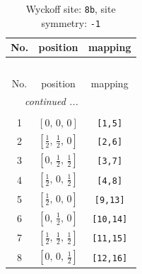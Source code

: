 \documentclass[fleqn,8pt]{jsarticle}
\begin{document}
\begin{longtable}{ccc}
\caption{Wyckoff site: {\tt 8b}, site symmetry: {\tt -1}}
 \\
 \hline \hline
No. & position & mapping \\ \hline \endfirsthead

\multicolumn{2}{l}{\tablename\ \thetable{}} \\
 \hline \hline
No. & position & mapping \\ \hline \endhead

 \hline \hline
\multicolumn{2}{r}{\footnotesize\it continued ...} \\ \endfoot

 \hline \hline
\multicolumn{2}{r}{} \\ \endlastfoot

1 & $\left[ 0,\, 0,\, 0 \right]$ & {\tt [1,5]} \\ \hline
2 & $\left[ \frac{1}{2},\, \frac{1}{2},\, 0 \right]$ & {\tt [2,6]} \\ \hline
3 & $\left[ 0,\, \frac{1}{2},\, \frac{1}{2} \right]$ & {\tt [3,7]} \\ \hline
4 & $\left[ \frac{1}{2},\, 0,\, \frac{1}{2} \right]$ & {\tt [4,8]} \\ \hline
5 & $\left[ \frac{1}{2},\, 0,\, 0 \right]$ & {\tt [9,13]} \\ \hline
6 & $\left[ 0,\, \frac{1}{2},\, 0 \right]$ & {\tt [10,14]} \\ \hline
7 & $\left[ \frac{1}{2},\, \frac{1}{2},\, \frac{1}{2} \right]$ & {\tt [11,15]} \\ \hline
8 & $\left[ 0,\, 0,\, \frac{1}{2} \right]$ & {\tt [12,16]} \\
\end{longtable}
\renewcommand{\arraystretch}{1.2}
\end{document}
